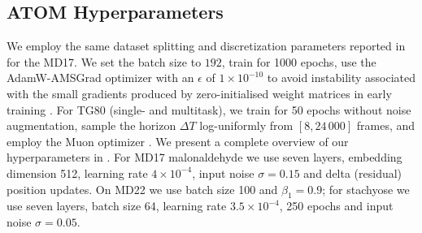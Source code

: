 \newpage
\subsection{ATOM Hyperparameters}
\label{appx:my_hyperparams}
We employ the same dataset splitting and discretization parameters reported in \textcite{xu_equivariant_2024} for the MD17. We set the batch size to \(192\), train for 1000 epochs, use the AdamW-AMSGrad optimizer \cite{loshchilov_decoupled_2017} with an \(\epsilon\) of \(1\times10^{-10}\) to avoid instability associated with the small gradients produced by zero-initialised weight matrices in early training \cite{jordan_nanogpt_2025}. For TG80 (single- and multitask), we train for 50 epochs without noise augmentation, sample the horizon \(\Delta T\) log-uniformly from \([8, 24\,000]\) frames, and employ the Muon optimizer \cite{jordan_muon_2024, kim_pytorch_optimizer_2021}. We present a complete overview of our hyperparameters in . For MD17 malonaldehyde we use seven layers, embedding dimension 512, learning rate \(4\times10^{-4}\), input noise \(\sigma=0.15\) and delta (residual) position updates. On MD22 we use batch size 100 and \(\beta_1=0.9\); for stachyose we use seven layers, batch size 64, learning rate \(3.5\times10^{-4}\), 250 epochs and input noise \(\sigma=0.05\).


